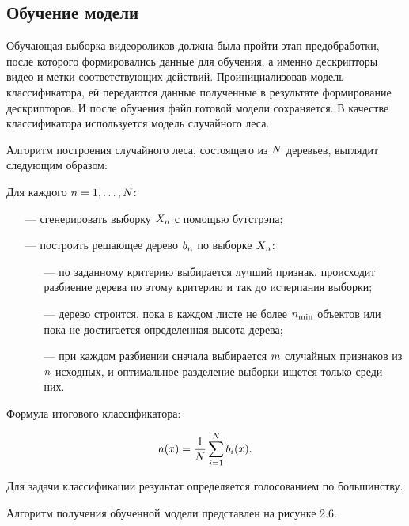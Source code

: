 \subsection{Обучение модели}
Обучающая выборка видеороликов должна была пройти этап предобработки, после которого формировались данные для обучения, а именно дескрипторы видео и метки соответствующих действий.
Проинициализовав модель классификатора, ей передаются данные полученные в результате формирование дескрипторов. И после обучения файл готовой модели сохраняется. В качестве классификатора используется модель случайного леса.

Алгоритм построения случайного леса, состоящего из $\large N$ деревьев, выглядит следующим образом:


Для каждого $\large n = 1, \dots, N$:



\begin{itemize}
	\item[---] сгенерировать выборку $\large X_n$ с помощью бутстрэпа;
	\item[---] построить решающее дерево $\large b_n$ по выборке $\large X_n$:
		\begin{itemize}
			\item[---] по заданному критерию выбирается лучший признак, происходит разбиение дерева по этому критерию и так до исчерпания выборки;
			\item[---] дерево строится, пока в каждом листе не более $\large n_\text{min}$ объектов или пока не достигается определенная высота дерева;
			\item[---] при каждом разбиении сначала выбирается $\large m$ случайных признаков из $\large n$ исходных,
			и оптимальное разделение выборки ищется только среди них.
			
		\end{itemize}
	
\end{itemize}

Формула итогового классификатора:

\begin{equation}
\large a(x) = \frac{1}{N}\sum_{i = 1}^N b_i(x).
\end{equation}

Для задачи классификации результат определяется  голосованием по большинству.

Алгоритм получения обученной модели представлен на рисунке 2.6.
\clearpage


